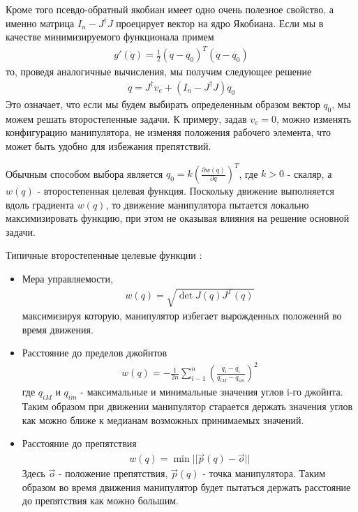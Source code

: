 Кроме того псевдо-обратный якобиан имеет одно очень полезное свойство, а именно матрица $I_{n} - J^{\dagger}J$ проецирует вектор на ядро Якобиана. Если мы в качестве минимизируемого функционала примем
\begin{align*}
	g\prime(\dot q) = \frac{1}{2}(\dot q - \dot{q_{0}})^T(\dot q - \dot{q_{0}})
\end{align*}
то, проведя аналогичные вычисления, мы получим следующее решение
\begin{align}
	\dot q = J^{\dagger}v_{e} + (I_{n} - J^{\dagger}J)\dot q_{0}
\end{align}
Это означает, что если мы будем выбирать определенным образом вектор $q_{0}$, мы можем решать второстепенные задачи. К примеру, задав $v_{e}=0$, можно изменять конфигурацию манипулятора, не изменяя положения рабочего элемента, что может быть удобно для избежания препятствий. 

Обычным способом выбора является $q_{0} = k(\frac{\partial w(q)}{\partial q})^T$, где $k > 0$ - скаляр, а $w(q)$ - второстепенная целевая функция. Поскольку движение выполняется вдоль градиента $w(q)$, то движение манипулятора пытается локально максимизировать функцию, при этом не оказывая влияния на решение основной задачи.

Типичные второстепенные целевые функции \cite{Bruno}:
\begin{itemize}
	\item 	Мера управляемости,
			\begin{align*}
				w(q) = \sqrt{\det J(q)J^{T}(q)}
			\end{align*}
			максимизируя которую, манипулятор избегает вырожденных положений во время движения.
			
	\item	Расстояние до пределов джойнтов
			\begin{align*}
				w(q) = -\frac{1}{2n}\sum_{i-1}^{n}(\frac{q_{i} - \overline{q_{i}}}{q_{iM} - q_{im}})^2
			\end{align*}
			где $q_{iM}$ и $q_{im}$ - максимальные и минимальные значения углов i-го джойнта. Таким образом при движении манипулятор старается держать значения углов как можно ближе к медианам возможных принимаемых значений.
		
	\item 	Расстояние до препятствия
			\begin{align*}
				w(q) = \min ||\vec{p}(q) - \vec{o}||
			\end{align*}
			Здесь $\vec{o}$ - положение препятствия, $\vec{p}(q)$ - точка манипулятора. Таким образом во время движения манипулятор будет пытаться держать расстояние до препятствия как можно большим.
\end{itemize}

